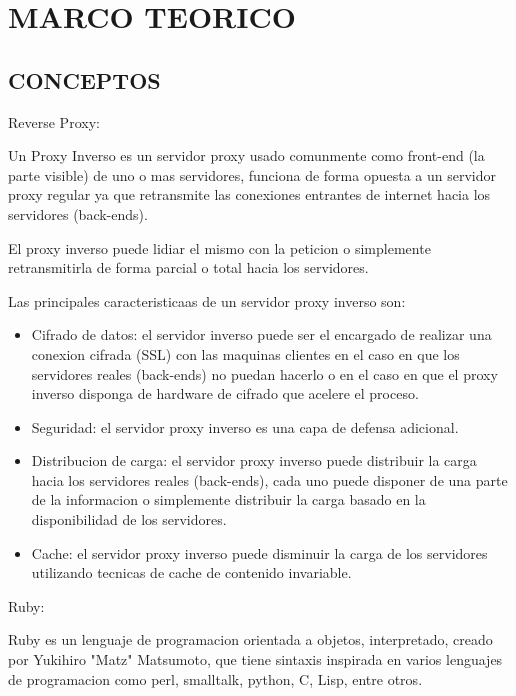 \section{MARCO TEORICO}

\subsection{CONCEPTOS}

Reverse Proxy:

Un Proxy Inverso es un servidor proxy usado comunmente como front-end (la parte visible)
de uno o mas servidores, funciona de forma opuesta a un servidor proxy regular ya que
retransmite las conexiones entrantes de internet hacia los servidores (back-ends).

El proxy inverso puede lidiar el mismo con la peticion o simplemente retransmitirla de
forma parcial o total hacia los servidores.

Las principales caracteristicaas de un servidor proxy inverso son:

\begin{itemize}
	\item Cifrado de datos: el servidor inverso puede ser el encargado de realizar una
	conexion cifrada (SSL) con las maquinas clientes en el caso en que los servidores
	reales (back-ends) no puedan hacerlo o en el caso en que el proxy inverso disponga
	de hardware de cifrado que acelere el proceso.
	
	\item Seguridad: el servidor proxy inverso es una capa de defensa adicional.
	
	\item Distribucion de carga: el servidor proxy inverso puede distribuir la carga
	hacia los servidores reales (back-ends), cada uno puede disponer de una parte de
	la informacion o simplemente distribuir la carga basado en la disponibilidad de los
	servidores.
	
	\item Cache: el servidor proxy inverso puede disminuir la carga de los servidores
	utilizando tecnicas de cache de contenido invariable.
\end{itemize}

Ruby:

Ruby es un lenguaje de programacion orientada a objetos, interpretado, creado por
Yukihiro "Matz" Matsumoto, que tiene sintaxis inspirada en varios lenguajes de programacion como perl, smalltalk, python, C, Lisp, entre otros.

